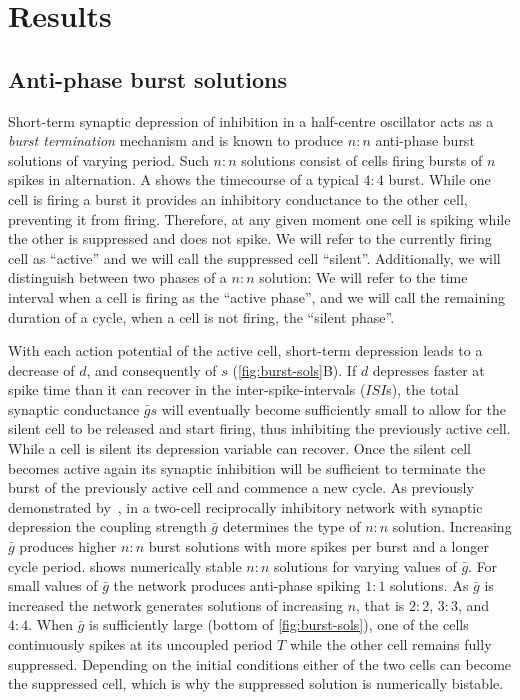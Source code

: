 \section{Results}
\subsection{Anti-phase burst solutions}
Short-term synaptic depression of inhibition in a half-centre oscillator acts as a \emph{burst termination} mechanism \citep{brown1911} and is known to produce $n:n$ anti-phase burst solutions of varying period.
Such $n:n$ solutions consist of cells firing bursts of $n$ spikes in alternation.
A shows the timecourse of a typical $4:4$ burst.
While one cell is firing a burst it provides an inhibitory conductance to the other cell,  preventing it from firing.
Therefore, at any given moment one cell is spiking while the other is suppressed and does not spike.
We will refer to the currently firing cell as ``active'' and we will call the suppressed cell ``silent''.
Additionally, we will distinguish between two phases of a $n:n$ solution:
We will refer to the time interval when a cell is firing as the ``active phase'', and we will call the remaining duration of a cycle, when a cell is not firing, the ``silent  phase''.

With each action potential of the active cell, short-term depression leads to a decrease of $d$, and consequently of $s$ (\cref{fig:burst-sols}B).
If $d$ depresses faster at spike time than it can recover in the inter-spike-intervals ($ISI$s), the total synaptic conductance $\bar g s$ will eventually become sufficiently small to allow for the silent cell to be released \citep{wang1992,skinner1994} and start firing, thus inhibiting the previously active cell.
While a cell is silent its depression variable can recover.
Once the silent cell becomes active again its synaptic inhibition will be sufficient to terminate the burst of the previously active cell and commence a new cycle.
As previously demonstrated by~\citet{bose2011}, in a two-cell reciprocally inhibitory network with synaptic depression the coupling strength $\bar g$ determines the type of $n:n$ solution.
Increasing $\bar g$ produces higher $n:n$ burst solutions with more spikes per burst and a longer cycle period.
 shows numerically stable $n:n$ solutions for varying values of $\bar g$.
For small values of $\bar g$ the network produces anti-phase spiking $1:1$ solutions.
As $\bar g$ is increased the network generates solutions of increasing $n$, that is $2:2$, $3:3$, and $4:4$.
When $\bar g$ is sufficiently large (bottom of \cref{fig:burst-sols}), one of the cells continuously spikes at its uncoupled period $T$ while the other cell remains fully suppressed.
Depending on the initial conditions either of the two cells can become the suppressed cell, which is why the suppressed solution is numerically bistable.

